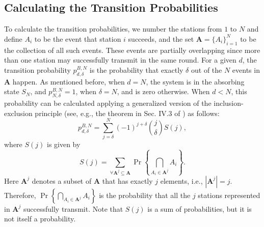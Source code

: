 \documentclass[journal]{IEEEtran}
\def\Abf{{\mathbf{A}}}
\newcommand{\pr}[1]{\Pr \left\{#1\right\}}
\begin{document}
\subsection{Calculating the Transition Probabilities}
To calculate the transition probabilities, we number the stations from $1$ to $N$ and define $A_i$ to be the event that station $i$ succeeds, and the set $\mathbf{A}=\{A_i\}_{i=1}^{N}$ to be the collection of all such events.
These events are partially overlapping since more than one station may successfully transmit in the same round. For a given $d$, the transition probability $p_{d,\delta}^{B,N}$ is the probability that exactly $\delta$ out of the $N$ events in $\Abf$ happen. As mentioned before, when $d = N$, the system is in the absorbing state $S_N$, and $p_{N,\delta}^{B,N} = 1$, when $\delta = N$, and is zero otherwise. When $d<N$, this probability can be calculated applying a generalized version of the inclusion-exclusion principle (see, e.g., the theorem in Sec. IV.3 of \cite{feller1968ipt}) as follows:
\begin{equation}
\label{eq:Pij}
p^{B,N}_{d,\delta} = \sum_{j=\delta}^{N} (-1)^{j+\delta}\binom{j}{\delta} S(j),
\end{equation}
where $S(j)$ is given by
\begin{equation}
\label{eq:S_j_def}
S(j) = \sum_{\forall \Abf^{j} \subseteq \Abf} \pr{\bigcap_{A_i \in \Abf^{j}} A_i}.
\end{equation}
Here $\Abf^{j}$ denotes a subset of $\Abf$ that has exactly $j$ elements, i.e., $|\mathbf{A}^{j}|=j$. Therefore, $\pr{\bigcap_{A_i \in \Abf^{j}} A_i}$ is the probability that all the $j$ stations represented in $\Abf^{j}$  successfully transmit. Note that $S(j)$ is a sum of probabilities, but it is not itself a probability.
\end{document}
